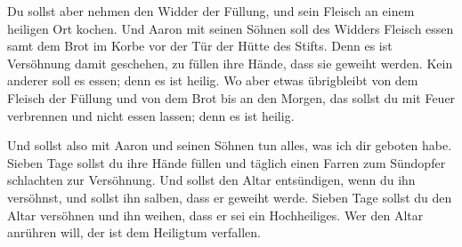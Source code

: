  Du sollst aber nehmen den Widder der Füllung, und sein
Fleisch an einem heiligen Ort kochen.  Und Aaron mit seinen
Söhnen soll des Widders Fleisch essen samt dem Brot im Korbe vor der Tür
der Hütte des Stifts.  Denn es ist Versöhnung damit
geschehen, zu füllen ihre Hände, dass sie geweiht werden. Kein anderer
soll es essen; denn es ist heilig.  Wo aber etwas
übrigbleibt von dem Fleisch der Füllung und von dem Brot bis an den
Morgen, das sollst du mit Feuer verbrennen und nicht essen lassen; denn
es ist heilig.

 Und sollst also mit Aaron und seinen Söhnen tun alles, was
ich dir geboten habe. Sieben Tage sollst du ihre Hände füllen
 und täglich einen Farren zum Sündopfer schlachten zur
Versöhnung. Und sollst den Altar entsündigen, wenn du ihn versöhnst, und
sollst ihn salben, dass er geweiht werde.  Sieben Tage
sollst du den Altar versöhnen und ihn weihen, dass er sei ein
Hochheiliges. Wer den Altar anrühren will, der ist dem Heiligtum
verfallen.

